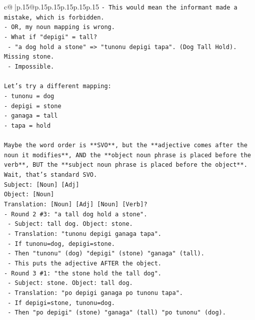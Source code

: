 \documentclass{article}
\begin{document}
{\begin{supertabular}{c@{$\;$}|p{.15\linewidth}@{}p{.15\linewidth}p{.15\linewidth}p{.15\linewidth}p{.15\linewidth}p{.15\linewidth}}
{{{\texttt{{-} This would mean the informant made a mistake, which is forbidden.} \\
\texttt{{-} OR, my noun mapping is wrong.} \\
\texttt{{-} What if "depigi" = tall?} \\
\texttt{  {-} "a dog hold a stone" => "tunonu depigi tapa". (Dog Tall Hold). Missing stone.} \\
\texttt{  {-} Impossible.} \\
\\ 
\texttt{Let's try a different mapping:} \\
\texttt{{-} tunonu = dog} \\
\texttt{{-} depigi = stone} \\
\texttt{{-} ganaga = tall} \\
\texttt{{-} tapa = hold} \\
\\ 
\texttt{Maybe the word order is **SVO**, but the **adjective comes after the noun it modifies**, AND the **object noun phrase is placed before the verb**, BUT the **subject noun phrase is placed before the object**.} \\
\texttt{Wait, that's standard SVO.} \\
\texttt{Subject: {[}Noun{]} {[}Adj{]}} \\
\texttt{Object: {[}Noun{]}} \\
\texttt{Translation: {[}Noun{]} {[}Adj{]} {[}Noun{]} {[}Verb{]}?} \\
\texttt{{-} Round 2 \#3: "a tall dog hold a stone".} \\
\texttt{  {-} Subject: tall dog. Object: stone.} \\
\texttt{  {-} Translation: "tunonu depigi ganaga tapa".} \\
\texttt{  {-} If tunonu=dog, depigi=stone.} \\
\texttt{  {-} Then "tunonu" (dog) "depigi" (stone) "ganaga" (tall).} \\
\texttt{  {-} This puts the adjective AFTER the object.} \\
\texttt{{-} Round 3 \#1: "the stone hold the tall dog".} \\
\texttt{  {-} Subject: stone. Object: tall dog.} \\
\texttt{  {-} Translation: "po depigi ganaga po tunonu tapa".} \\
\texttt{  {-} If depigi=stone, tunonu=dog.} \\
\texttt{  {-} Then "po depigi" (stone) "ganaga" (tall) "po tunonu" (dog).} \\
}}}
\end{supertabular}}
\end{document}
